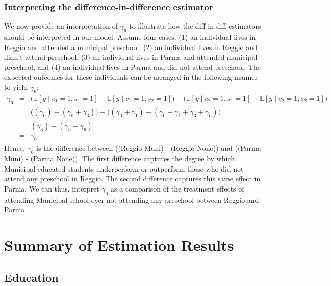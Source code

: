\documentclass[11pt]{article}
\begin{document}
\subsubsection{Interpreting the difference-in-difference estimator}
We now provide an interpretation of $\gamma_6$ to illustrate how the diff-in-diff estimators should be interpreted in our model. Assume four cases: (1) an individual lives in Reggio and attended a municipal preschool, (2) an individual lives in Reggio and didn't attend preschool, (3) an individual lives in Parma and attended municipal preschool, and (4) an individual lives in Parma and did not attend preschool. The expected outcomes for these individuals can be arranged in the following manner to yield $\gamma_6$:
\begin{eqnarray*}
\gamma_6 & = & \Big( \mathbb{E}[y \mid c_1 = 1, s_1 = 1]  - \mathbb{E}[y \mid c_1 = 1, s_2 = 1] \Big) - \Big(\mathbb{E}[y \mid c_2 = 1, s_1 = 1] - \mathbb{E}[y \mid c_2 = 1, s_2 = 1] \Big) \\
& = & \Big( (\gamma_0)  - (\gamma_0 + \gamma_3)\Big) - \Big((\gamma_0 + \gamma_1) - (\gamma_0 + \gamma_1 + \gamma_3 + \gamma_6)\Big) \\
& = & (\gamma_3) - ( \gamma_3 - \gamma_6) \\
& = & \gamma_6
\end{eqnarray*}
Hence, $\gamma_6$ is the difference between \Big((Reggio Muni) - (Reggio None)\Big) and \Big((Parma Muni) - (Parma None)\Big). The first difference captures the degree by which Municipal educated students underperform or outperform those who did not attend any preschool in Reggio. The second difference captures this same effect in Parma. We can thus, interpret $\gamma_6$ as a comparison of the treatment effects of attending Municipal school over not attending any preschool  between Reggio and Parma.

\section{Summary of Estimation Results}
\subsection{Education}
\end{document}
